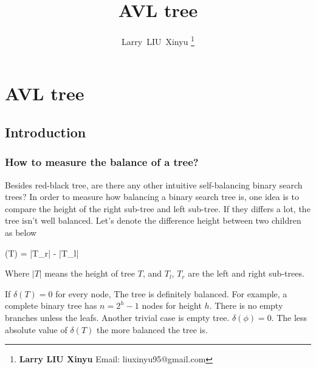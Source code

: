 \documentclass{article}
\begin{document}


\title{AVL tree}

\author{Larry~LIU~Xinyu
\thanks{{\bfseries Larry LIU Xinyu } \newline
  Email: liuxinyu95@gmail.com \newline}
  }

\maketitle
\fi


\ifx\wholebook\relax
\chapter{AVL tree}
\fi

\section{Introduction}
\label{introduction} 

\subsection{How to measure the balance of a tree?}
Besides red-black tree, are there any other intuitive self-balancing
binary search trees? In order to measure how balancing a binary search tree is,
one idea is to compare the height of the right sub-tree and left sub-tree.
If they differs a lot, the tree isn't well balanced. Let's denote the
difference height between two children as below

\be
  \delta(T) = |T_r| - |T_l|
\ee

Where $|T|$ means the height of tree $T$, and $T_l$, $T_r$ are the left
and right sub-trees.

If $\delta(T) = 0$ for every node, The tree is definitely balanced. For example, a
complete binary tree has $n=2^h-1$ nodes for height $h$. There is
no empty branches unless the leafs. Another trivial case is empty
tree. $\delta(\phi) = 0$. The less absolute value of $\delta(T)$
the more balanced the tree is.
\end{document}
